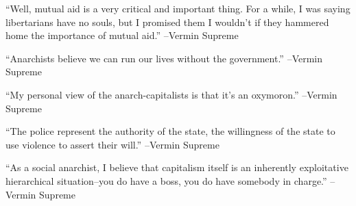 \documentclass{article}%
\begin{document}
\linebreak%
\vspace{1mm}%
\begin{minipage}{\textwidth}%
\flushleft%
“Well, mutual aid is a very critical and important thing. For a while, I was saying libertarians have no souls, but I promised them I wouldn't if they hammered home the importance of mutual aid.”%
\linebreak%
\vspace{1mm}%
–Vermin Supreme%
\linebreak%
\vspace{1mm}%
\end{minipage}%
\linebreak%
\vspace{1mm}%
\begin{minipage}{\textwidth}%
\flushleft%
“Anarchists believe we can run our lives without the government.”%
\linebreak%
\vspace{1mm}%
–Vermin Supreme%
\linebreak%
\vspace{1mm}%
\end{minipage}%
\linebreak%
\vspace{1mm}%
\begin{minipage}{\textwidth}%
\flushleft%
“My personal view of the anarch{-}capitalists is that it's an oxymoron.”%
\linebreak%
\vspace{1mm}%
–Vermin Supreme%
\linebreak%
\vspace{1mm}%
\end{minipage}%
\linebreak%
\vspace{1mm}%
\begin{minipage}{\textwidth}%
\flushleft%
“The police represent the authority of the state, the willingness of the state to use violence to assert their will.”%
\linebreak%
\vspace{1mm}%
–Vermin Supreme%
\linebreak%
\vspace{1mm}%
\end{minipage}%
\linebreak%
\vspace{1mm}%
\begin{minipage}{\textwidth}%
\flushleft%
“As a social anarchist, I believe that capitalism itself is an inherently exploitative hierarchical situation–you do have a boss, you do have somebody in charge.”%
\linebreak%
\vspace{1mm}%
–Vermin Supreme%
\linebreak%
\vspace{1mm}%
\end{minipage}%
\end{document}
